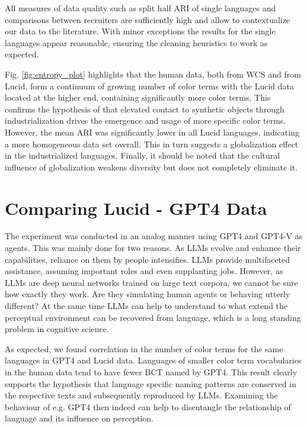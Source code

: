 All measures of data quality such as split half ARI of single languages and comparisons between recruiters are sufficiently high and allow to contextualize our data to the literature. 
With minor exceptions the results for the single languages appear reasonable, ensuring the cleaning heuristics to work as expected.

Fig. \ref{fig:entropy_plot} highlights that the human data, both from WCS and from Lucid, form a continuum of growing number of color terms with the Lucid data located at the higher end, containing significantly more color terms. 
This confirms the hypothesis of \textcite{gibsonColor2017} that elevated contact to synthetic objects through industrialization drives the emergence and usage of more specific color terms. However, the mean ARI was significantly lower in all Lucid languages, indicating a more homogeneous data set overall. This in turn suggests a globalization effect in the industrialized languages. Finally, it should be noted that the cultural influence of globalization weakens diversity but does not completely eliminate it.






\section{Comparing Lucid - GPT4 Data}
The experiment was conducted in an analog manner using GPT4 and GPT4-V as agents. This was mainly done for two reasons. As LLMs evolve and enhance their capabilities, reliance on them by people intensifies. LLMs provide multifaceted assistance, assuming important roles and even supplanting jobs.
However, as LLMs are deep neural networks trained on large text corpora, we cannot be sure how exactly they work. Are they simulating human agents or behaving utterly different? At the same time LLMs can help to understand to what extend the perceptual environment can be recovered from language, which is a long standing problem in cognitive science.

As expected, we found correlation in the number of color terms for the same languages in GPT4 and Lucid data. Languages of smaller color term vocabularies in the human data tend to have fewer BCT named by GPT4. This result clearly supports the hypothesis that language specific naming patterns are conserved in the respective texts and subsequently reproduced by LLMs. Examining the behaviour of e.g. GPT4 then indeed can help to disentangle the relationship of language and its influence on perception.

